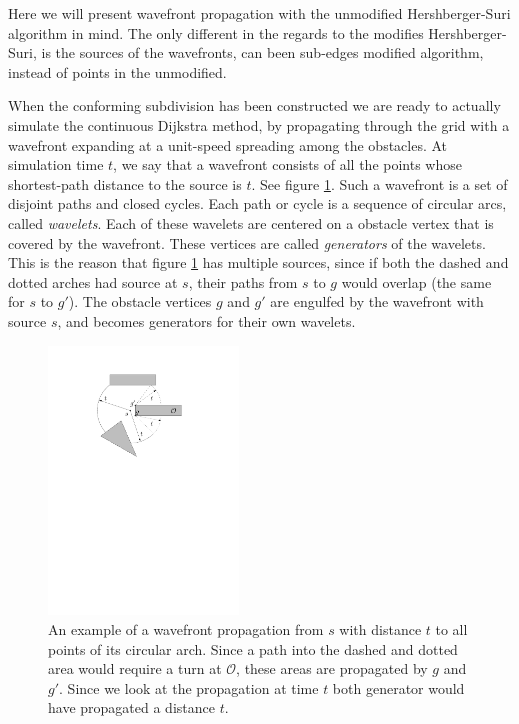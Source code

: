 Here we will present wavefront propagation with the unmodified Hershberger-Suri 
algorithm in mind. The only different in the regards to the modifies Hershberger-
Suri, is the sources of the wavefronts, can been sub-edges modified algorithm, 
instead of points in the unmodified.

When the conforming subdivision has been constructed we are ready to actually 
simulate the continuous Dijkstra method, by propagating through the grid with 
a wavefront expanding at a unit-speed spreading among the obstacles. At simulation 
time $t$, we say that a wavefront consists of all the points whose shortest-path
distance to the source is $t$. See figure \ref{fig:wavefrontpropagation}. Such a 
wavefront is a set of disjoint paths and closed cycles. Each path or cycle is a 
sequence of circular arcs, called \textit{wavelets}. Each of these wavelets are 
centered on a obstacle vertex that is covered by the wavefront. These vertices 
are called \textit{generators} of the wavelets. This is the reason that figure 
\ref{fig:wavefrontpropagation} has multiple sources, since if both the dashed 
and dotted arches had source at $s$, their paths from $s$ to $g$ would overlap 
(the same for $s$ to $g'$). The obstacle vertices $g$ and $g'$ are engulfed by 
the wavefront with source $s$, and becomes generators for their own wavelets.

\begin{figure}
	\centering
	\includegraphics[width=0.45\textwidth]{figures/wavefrontpropagation.pdf}
	\caption{An example of a wavefront propagation from $s$ with distance $t$ to all
    		 points of its circular arch. Since a path into the dashed and dotted 
             area would require a turn at $\mathcal{O}$, these areas are propagated 
             by $g$ and $g'$. Since we look at the propagation at time $t$ both 
             generator would have propagated a distance $t$.}
	\label{fig:wavefrontpropagation}
\end{figure}

